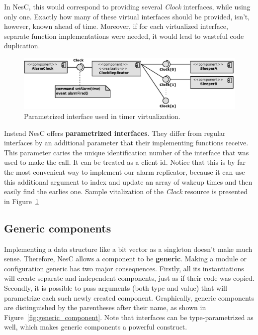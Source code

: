In NesC, this would correspond to providing several \emph{Clock} interfaces, while using only one. Exactly how many of these virtual interfaces should be provided, isn't, however, known ahead of time.  Moreover, if for each virtualized interface, separate function implementations were needed, it would lead to wasteful code duplication.

\begin{figure}[h]
  \centering
  \includegraphics[width=1.0\textwidth]{diagrams/parametrized_interface.eps}
  \caption{Parametrized interface used in timer virtualization.}
  \label{fig:parametrized_interface}
\end{figure}

Instead NesC offers {\bf parametrized interfaces}. They differ from regular interfaces by an additional parameter that their implementing functions receive. This parameter caries the unique identification number of the interface that was used to make the call. It can be treated as a client id.   Notice that this is by far the most convenient way to implement our alarm replicator, because it can use this additional argument to index and update an array of wakeup times and then easily find the earlies one. Sample vitalization of the \emph{Clock} resource is presented in Figure~\ref{fig:parametrized_interface}

\subsection{Generic components}

Implementing a data structure like a bit vector as a singleton doesn't make much sense. Therefore, NesC allows a component to be {\bf generic}. Making a module or configuration generic has two major consequences. Firstly, all its instantiations will create separate and independent components, just as if their code was copied. Secondly, it is possible to pass arguments (both type and value) that will parametrize each such newly created component. Graphically, generic components are distinguished by the parentheses after their name, as shown in Figure~\ref{fig:generic_component}. Note that interfaces
can be type-parametrized as well, which makes generic components a powerful construct.

